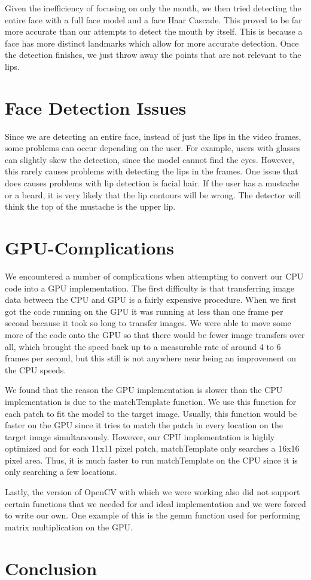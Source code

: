Given the inefficiency of focusing on only the mouth, we then tried detecting the entire face with a full face model and a face Haar Cascade. This proved to be far more accurate than our attempts to detect the mouth by itself. This is because a face has more distinct landmarks which allow for more accurate detection. Once the detection finishes, we just throw away the points that are not relevant to the lips.

\section{Face Detection Issues}
Since we are detecting an entire face, instead of just the lips in the video frames, some problems can occur depending on the user. For example, users with glasses can slightly skew the detection, since the model cannot find the eyes. However, this rarely causes problems with detecting the lips in the frames. One issue that does causes problems with lip detection is facial hair. If the user has a mustache or a beard, it is very likely that the lip contours will be wrong. The detector will think the top of the mustache is the upper lip.

\section{GPU-Complications}

We encountered a number of complications when attempting to convert our CPU code into a GPU implementation. The first difficulty is that transferring image data between the CPU and GPU is a fairly expensive procedure. When we first got the code running on the GPU it was running at less than one frame per second because it took so long to transfer images. We were able to move some more of the code onto the GPU so that there would be fewer image transfers over all, which brought the speed back up to a measurable rate of around 4 to 6 frames per second, but this still is not anywhere near being an improvement on the CPU speeds.

We found that the reason the GPU implementation is slower than the CPU implementation is due to the matchTemplate function. We use this function for each patch to fit the model to the target image. Usually, this function would be faster on the GPU since it tries to match the patch in every location on the target image simultaneously. However, our CPU implementation is highly optimized and for each 11x11 pixel patch, matchTemplate only searches a 16x16 pixel area. Thus, it is much faster to run matchTemplate on the CPU since it is only searching a few locations.

Lastly, the version of OpenCV with which we were working also did not support certain functions that we needed for and ideal implementation and we were forced to write our own. One example of this is the gemm function used for performing matrix multiplication on the GPU.

\section{Conclusion}